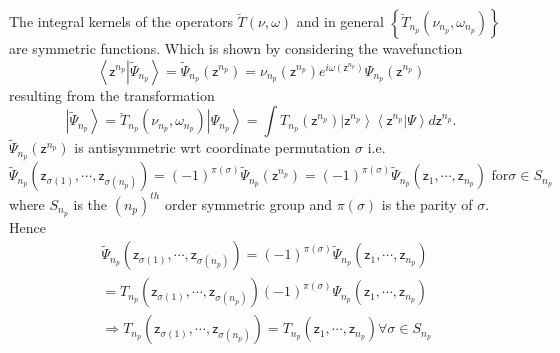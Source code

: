 \documentclass[aps,preprint]{revtex4}%
\begin{document}
The integral kernels of the operators $\breve{T}\left(  \nu,\omega\right)  $
and in general $\left\{  \breve{T}_{n_{p}}\left(  \nu_{n_{p}},\omega_{n_{p}%
}\right)  \right\}  $ are symmetric functions. Which is shown by considering
the wavefunction
\begin{equation}
\left\langle \mathsf{z}^{n_{p}}\left\vert \tilde{\Psi}_{n_{p}}\right.
\right\rangle =\tilde{\Psi}_{n_{p}}\left(  \mathsf{z}^{n_{p}}\right)
=\nu_{n_{p}}\left(  \mathsf{z}^{n_{p}}\right)  e^{i\omega\left(
\mathsf{z}^{n_{p}}\right)  }\Psi_{n_{p}}\left(  \mathsf{z}^{n_{p}}\right)
\end{equation}
resulting from the transformation
\begin{equation}
\left\vert \tilde{\Psi}_{n_{p}}\right\rangle =\breve{T}_{n_{p}}\left(
\nu_{n_{p}},\omega_{n_{p}}\right)  \left\vert \Psi_{n_{p}}\right\rangle =\int
T_{n_{p}}\left(  \mathsf{z}^{n_{p}}\right)  \left\vert \mathsf{z}^{n_{p}%
}\right\rangle \left\langle \mathsf{z}^{n_{p}}|\Psi\right\rangle
d\mathsf{z}^{n_{p}}.
\end{equation}
$\tilde{\Psi}_{n_{p}}\left(  \mathsf{z}^{n_{p}}\right)  $ is antisymmetric wrt
coordinate permutation $\sigma$ i.e.
\begin{equation}
\tilde{\Psi}_{n_{p}}\left(  \mathsf{z}_{\sigma\left(  1\right)  }%
,\cdots,\mathsf{z}_{\sigma\left(  n_{p}\right)  }\right)  =\left(  -1\right)
^{\pi\left(  \sigma\right)  }\tilde{\Psi}_{n_{p}}\left(  \mathsf{z}^{n_{p}%
}\right)  =\left(  -1\right)  ^{\pi\left(  \sigma\right)  }\tilde{\Psi}%
_{n_{p}}\left(  \mathsf{z}_{1},\cdots,\mathsf{z}_{n_{p}}\right)  \text{ for
}\sigma\in S_{n_{p}}%
\end{equation}
where $S_{n_{p}}$ is the $\left(  n_{p}\right)  ^{th}$ order symmetric group
and $\pi\left(  \sigma\right)  $ is the parity of $\sigma$. Hence%
\begin{align}
&  \tilde{\Psi}_{n_{p}}\left(  \mathsf{z}_{\sigma\left(  1\right)  }%
,\cdots,\mathsf{z}_{\sigma\left(  n_{p}\right)  }\right)  =\left(  -1\right)
^{\pi\left(  \sigma\right)  }\tilde{\Psi}_{n_{p}}\left(  \mathsf{z}_{1}%
,\cdots,\mathsf{z}_{n_{p}}\right) \nonumber\\
&  =T_{n_{p}}\left(  \mathsf{z}_{\sigma\left(  1\right)  },\cdots
,\mathsf{z}_{\sigma\left(  n_{p}\right)  }\right)  \left(  -1\right)
^{\pi\left(  \sigma\right)  }\Psi_{n_{p}}\left(  \mathsf{z}_{1},\cdots
,\mathsf{z}_{n_{p}}\right) \nonumber\\
&  \Rightarrow T_{n_{p}}\left(  \mathsf{z}_{\sigma\left(  1\right)  }%
,\cdots,\mathsf{z}_{\sigma\left(  n_{p}\right)  }\right)  =T_{n_{p}}\left(
\mathsf{z}_{1},\cdots,\mathsf{z}_{n_{p}}\right)  \forall\sigma\in S_{n_{p}}%
\end{align}
\end{document}
